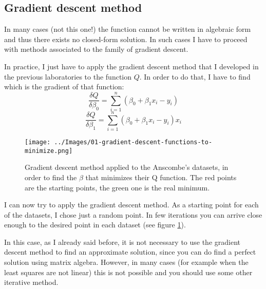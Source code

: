     \subsection{Gradient descent method}
        In many cases (not this one!) the function cannot be written in algebraic form and thus there exists no closed-form solution. In such cases I have to proceed with methods associated to the family of gradient descent.\par
        In practice, I just have to apply the gradient descent method that I developed in the previous laboratories to the function \(Q\). In order to do that, I have to find which is the gradient of that function:
        \[\frac{\delta Q}{\delta \beta_0} = \sum_{i=1}^{n}(\beta_0 +\beta_1 x_i - y_i)\]
        \[\frac{\delta Q}{\delta \beta_1} = \sum_{i=1}^{n}(\beta_0 +\beta_1 x_i - y_i)x_i\]
        \begin{figure}
            \centering
            \texttt{[image: ../Images/01-gradient-descent-functions-to-minimize.png]}
            \caption{Gradient descent method applied to the Anscombe's datasets, in order to find the \(\beta\) that minimizes their Q function. The red points are the starting points, the green one is the real minimum.}
            \label{gradient-descent-functions-to-minimize}
        \end{figure}
        I can now try to apply the gradient descent method. As a starting point for each of the datasets, I chose just a random point. In few iterations you can arrive close enough to the desired point in each dataset (see figure \ref{gradient-descent-functions-to-minimize}).\par
        In this case, as I already said before, it is not necessary to use the gradient descent method to find an approximate solution, since you can do find a perfect solution using matrix algebra. However, in many cases (for example when the least squares are not linear) this is not possible and you should use some other iterative method.